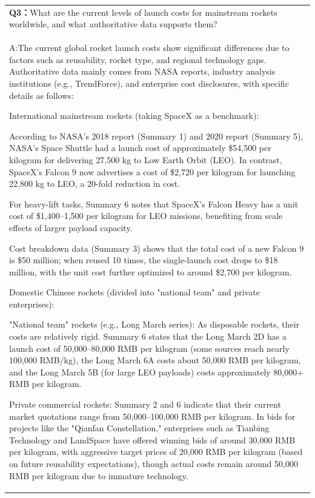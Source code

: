 \begin{longtable}[]{@{}
  >{\raggedright\arraybackslash}p{}@{}}
\toprule
\endhead
\textbf{Q3：}What are the current levels of launch costs for mainstream
rockets worldwide, and what authoritative data supports them? \\
A:The current global rocket launch costs show significant differences
due to factors such as reusability, rocket type, and regional technology
gaps. Authoritative data mainly comes from NASA reports, industry
analysis institutions (e.g., TrendForce), and enterprise cost
disclosures, with specific details as follows:

International mainstream rockets (taking SpaceX as a benchmark):

According to NASA's 2018 report (Summary 1) and 2020 report (Summary 5),
NASA's Space Shuttle had a launch cost of approximately \$54,500 per
kilogram for delivering 27,500 kg to Low Earth Orbit (LEO). In contrast,
SpaceX's Falcon 9 now advertises a cost of \$2,720 per kilogram for
launching 22,800 kg to LEO, a 20-fold reduction in cost.

For heavy-lift tasks, Summary 6 notes that SpaceX's Falcon Heavy has a
unit cost of \$1,400--1,500 per kilogram for LEO missions, benefiting
from scale effects of larger payload capacity.

Cost breakdown data (Summary 3) shows that the total cost of a new
Falcon 9 is \$50 million; when reused 10 times, the single-launch cost
drops to \$18 million, with the unit cost further optimized to around
\$2,700 per kilogram.

Domestic Chinese rockets (divided into "national team" and private
enterprises):

"National team" rockets (e.g., Long March series): As disposable
rockets, their costs are relatively rigid. Summary 6 states that the
Long March 2D has a launch cost of 50,000--80,000 RMB per kilogram (some
sources reach nearly 100,000 RMB/kg), the Long March 6A costs about
50,000 RMB per kilogram, and the Long March 5B (for large LEO payloads)
costs approximately 80,000+ RMB per kilogram.

Private commercial rockets: Summary 2 and 6 indicate that their current
market quotations range from 50,000--100,000 RMB per kilogram. In bids
for projects like the "Qianfan Constellation," enterprises such as
Tianbing Technology and LandSpace have offered winning bids of around
30,000 RMB per kilogram, with aggressive target prices of 20,000 RMB per
kilogram (based on future reusability expectations), though actual costs
remain around 50,000 RMB per kilogram due to immature technology.


\end{longtable}
